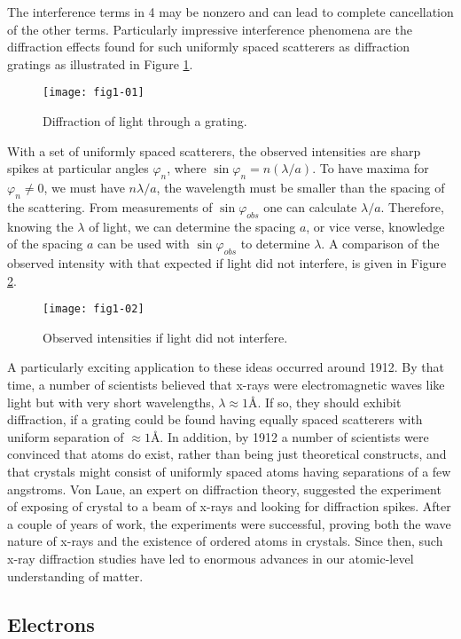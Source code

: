 The interference terms in 4 may be nonzero and can lead to complete 
cancellation of the other terms.  Particularly impressive interference phenomena 
are the diffraction effects found for such uniformly spaced scatterers as 
diffraction gratings as illustrated in Figure \ref{fig1-1}.
\begin{figure}
\texttt{[image: fig1-01]}
\caption{Diffraction of light through a grating.}
\label{fig1-1}
\end{figure}
\noindent
With a set of uniformly spaced scatterers, the observed intensities
are sharp spikes at particular angles $\varphi_n$, where $\sin
\varphi_n = n (\lambda/a)$.  To have maxima for $\varphi_n \not= 0$,
we must have $n \lambda / a$, the wavelength must be smaller than the
spacing of the scattering. From measurements of $\sin \varphi_{obs}$
one can calculate $\lambda/a$.  Therefore, knowing the $\lambda$ of
light, we can determine the spacing $a$, or vice verse, knowledge of
the spacing $a$ can be used with $\sin \varphi_{obs}$ to determine
$\lambda$.  A comparison of the observed intensity with that expected
if light did not interfere, is given in Figure \ref{fig1-2}.
\begin{figure}
\begin{center}
\texttt{[image: fig1-02]}
\end{center}
\caption{Observed intensities if light did not interfere.}
\label{fig1-2}
\end{figure}

A particularly exciting application to these ideas occurred around
1912.  By that time, a number of scientists believed that x-rays were
electromagnetic waves like light but with very short wavelengths,
$\lambda \approx 1$\AA.  If so, they should exhibit diffraction, if a
grating could be found having equally spaced scatterers with uniform
separation of $\approx 1$\AA. In addition, by 1912 a number of scientists
were convinced that atoms do exist, rather than being just theoretical
constructs, and that crystals might consist of uniformly spaced atoms
having separations of a few angstroms. Von Laue, an expert on
diffraction theory, suggested the experiment of exposing of crystal to
a beam of x-rays and looking for diffraction spikes. After a couple of
years of work, the experiments were successful, proving both the wave
nature of x-rays and the existence of ordered atoms in crystals. Since
then, such x-ray diffraction studies have led to enormous advances in
our atomic-level understanding of matter.

\subsection{Electrons}

